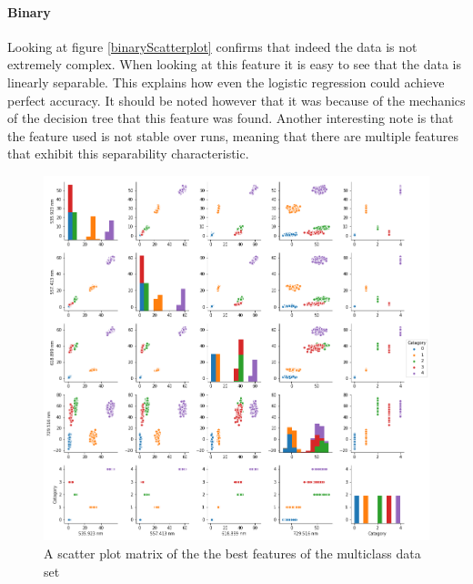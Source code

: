 \documentclass[british]{article}
\begin{document}
	\paragraph{Binary} Looking at figure \ref{binaryScatterplot} confirms that indeed the data is not extremely complex. When looking at this feature it is easy to see that the data is linearly separable. This explains how even the logistic regression could achieve perfect accuracy. It should be noted however that it was because of the mechanics of the decision tree that this feature was found. Another interesting note is that the feature used is not stable over runs, meaning that there are multiple features that exhibit this separability characteristic.    
	
	
	
	\begin{figure}[!ht]
		\centering
		\includegraphics[width=\textwidth]{multiclassScatterplot}
		\caption{A scatter plot matrix of the the best features of the multiclass data set}
		\label{multiclassScatterplot}
	\end{figure}
	
	
\end{document}
